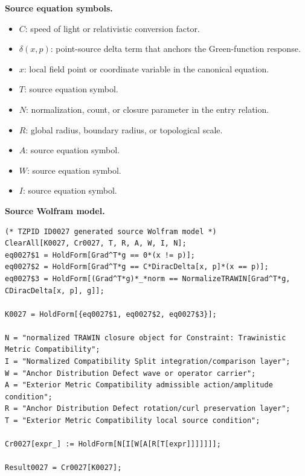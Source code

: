 \begin{minipage}[t]{0.49\linewidth}
\begingroup
\small
\raggedright
\textbf{Source equation symbols.}\par
\begin{itemize}[leftmargin=1.35em,itemsep=1pt,topsep=1pt,parsep=0pt]
    \item $C$: speed of light or relativistic conversion factor.
    \item $\delta(x,p)$: point-source delta term that anchors the Green-function response.
    \item $x$: local field point or coordinate variable in the canonical equation.
    \item $T$: source equation symbol.
    \item $N$: normalization, count, or closure parameter in the entry relation.
    \item $R$: global radius, boundary radius, or topological scale.
    \item $A$: source equation symbol.
    \item $W$: source equation symbol.
    \item $I$: source equation symbol.
\end{itemize}
\endgroup
\end{minipage}\hfill
\begin{minipage}[t]{0.47\linewidth}
\begingroup
\scriptsize
\raggedright
\textbf{Source Wolfram model.}\par
\begin{Verbatim}[fontsize=\tiny,breaklines=true,breakanywhere=true]
(* TZPID ID0027 generated source Wolfram model *)
ClearAll[K0027, Cr0027, T, R, A, W, I, N];
eq0027$1 = HoldForm[Grad^T*g == 0*(x != p)];
eq0027$2 = HoldForm[Grad^T*g == C*DiracDelta[x, p]*(x == p)];
eq0027$3 = HoldForm[(Grad^T*g)*_*norm == NormalizeTRAWIN[Grad^T*g, CDiracDelta[x, p], g]];

K0027 = HoldForm[{eq0027$1, eq0027$2, eq0027$3}];

N = "normalized TRAWIN closure object for Constraint: Trawinistic Metric Compatibility";
I = "Normalized Compatibility Split integration/comparison layer";
W = "Anchor Distribution Defect wave or operator carrier";
A = "Exterior Metric Compatibility admissible action/amplitude condition";
R = "Anchor Distribution Defect rotation/curl preservation layer";
T = "Exterior Metric Compatibility local source condition";

Cr0027[expr_] := HoldForm[N[I[W[A[R[T[expr]]]]]]];

Result0027 = Cr0027[K0027];
\end{Verbatim}
\endgroup
\end{minipage}

